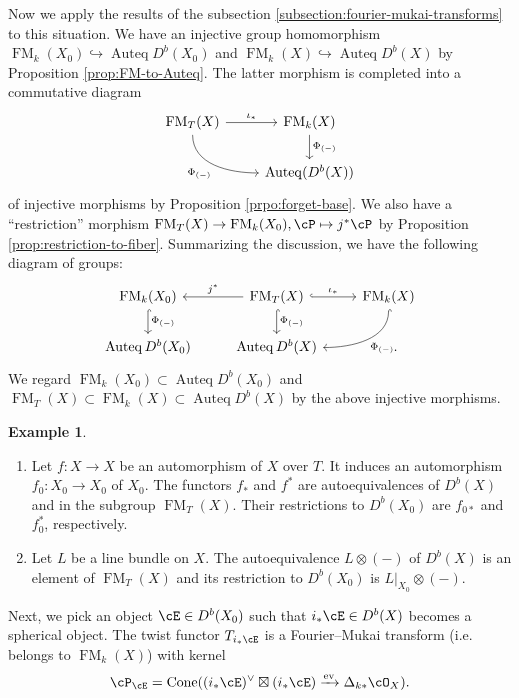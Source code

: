 \documentclass[12pt]{amsart}
\numberwithin{equation}{section}
\theoremstyle{plain}
\theoremstyle{definition}
\newtheorem{example}[theorem]{Example}
\DeclareMathOperator{\Auteq}{\mathrm{Auteq}}
\DeclareMathOperator{\Cone}{\mathrm{Cone}}
\DeclareMathOperator{\ev}{\mathrm{ev}}
\DeclareMathOperator{\FM}{\mathrm{FM}}
\begin{document}
Now we apply the results of the subsection \ref{subsection:fourier-mukai-transforms} to this situation.
We have an injective group homomorphism $\FM_k(X_0) \hookrightarrow \Auteq D^b(X_0)$ and $\FM_k(X) \hookrightarrow \Auteq D^b(X)$ by Proposition \ref{prop:FM-to-Auteq}.
The latter morphism is completed into a commutative diagram
\[
    \begin{tikzcd}
        \FM_T(X) \ar[r, "\iota_*"] \ar[rd, out=-90, in=180, "\Phi_{(-)}"'] & \FM_k(X) \ar[d, "\Phi_{(-)}"] \\
        & \Auteq(D^b(X))
    \end{tikzcd}
\]
of injective morphisms by Proposition \ref{prpo:forget-base}.
We also have a ``restriction'' morphism $\FM_T(X) \to \FM_k(X_0), \cP \mapsto j^* \cP$ by Proposition \ref{prop:restriction-to-fiber}.
Summarizing the discussion, we have the following diagram of groups:
\[
    \begin{tikzcd}
        \FM_k(X_0) \ar[d, hookrightarrow, "\Phi_{(-)}"] & \FM_T(X)\ar[l, "j^*"']\ar[r, hookrightarrow, "\iota_*"]\ar[d, hookrightarrow, "\Phi_{(-)}"] & \FM_{k}(X) \ar[ld, hookrightarrow, out=-90, in=0, "\Phi_{(-)}"]\\
        \Auteq D^b(X_0) & \Auteq D^b(X)& \quad .
    \end{tikzcd}
\]
We regard $\FM_k(X_0) \subset \Auteq D^b(X_0)$ and $\FM_T(X) \subset \FM_k(X) \subset \Auteq D^b(X)$ by the above injective morphisms.
\begin{example}
    \begin{enumerate}
        \item Let $f \colon X \to X$ be an automorphism of $X$ over $T$.
              It induces an automorphism $f_0 \colon X_0 \to X_0$ of $X_0$.
              The functors $f_*$ and $f^*$ are autoequivalences of $D^b(X)$ and in the subgroup $\FM_T(X)$. Their restrictions to $D^b(X_0)$ are $f_{0*}$ and $f_0^*$, respectively.
        \item Let $L$ be a line bundle on $X$.
              The autoequivalence $L \otimes (-)$ of $D^b(X)$ is an element of $\FM_T(X)$ and its restriction to $D^b(X_0)$ is $L\vert_{X_0} \otimes (-)$.
    \end{enumerate}
\end{example}
Next, we pick an object $\cE \in D^b(X_0)$ such that $i_*{\cE} \in D^b(X)$ becomes a spherical object.
The twist functor $T_{i_*{\cE}}$ is a Fourier--Mukai transform (i.e.~ belongs to $\FM_k(X)$) with kernel
\begin{equation}
    \cP_{\cE} = \Cone((i_*{\cE})^\vee \boxtimes (i_*{\cE}) \xrightarrow{\ev} \Delta_{k*}\cO_X).
\end{equation}
\end{document}
